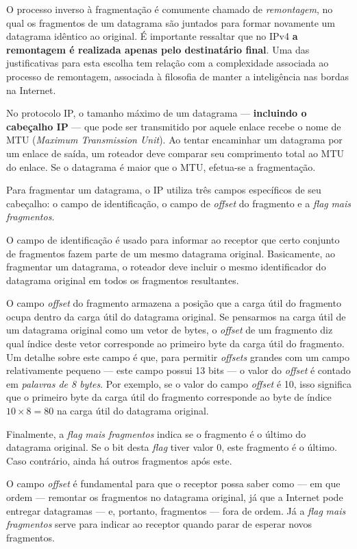 \documentclass{article}
\begin{document}
O processo inverso à fragmentação é comumente chamado de \textit{remontagem}, no qual os fragmentos de um datagrama são juntados para formar novamente um datagrama idêntico ao original. É importante ressaltar que no IPv4 \textbf{a remontagem é realizada apenas pelo destinatário final}. Uma das justificativas para esta escolha tem relação com a complexidade associada ao processo de remontagem, associada à filosofia de manter a inteligência nas bordas na Internet.

No protocolo IP, o tamanho máximo de um datagrama --- \textbf{incluindo o cabeçalho IP} --- que pode ser transmitido por aquele enlace recebe o nome de MTU (\textit{Maximum Transmission Unit}). Ao tentar encaminhar um datagrama por um enlace de saída, um roteador deve comparar seu comprimento total ao MTU do enlace. Se o datagrama é maior que o MTU, efetua-se a fragmentação.

Para fragmentar um datagrama, o IP utiliza três campos específicos de seu cabeçalho: o campo de identificação, o campo de \textit{offset} do fragmento e a \textit{flag} \textit{mais fragmentos}. 

O campo de identificação é usado para informar ao receptor que certo conjunto de fragmentos fazem parte de um mesmo datagrama original. Basicamente, ao fragmentar um datagrama, o roteador deve incluir o mesmo identificador do datagrama original em todos os fragmentos resultantes.

O campo \textit{offset} do fragmento armazena a posição que a carga útil do fragmento ocupa dentro da carga útil do datagrama original. Se pensarmos na carga útil de um datagrama original como um vetor de bytes, o \textit{offset} de um fragmento diz qual índice deste vetor corresponde ao primeiro byte da carga útil do fragmento. Um detalhe sobre este campo é que, para permitir \textit{offsets} grandes com um campo relativamente pequeno --- este campo possui 13 bits --- o valor do \textit{offset} é contado em \textit{palavras de 8 bytes}. Por exemplo, se o valor do campo \textit{offset} é 10, isso significa que o primeiro byte da carga útil do fragmento corresponde ao byte de índice $10\times 8 = 80$ na carga útil do datagrama original.

Finalmente, a \textit{flag} \textit{mais fragmentos} indica se o fragmento é o último do datagrama original. Se o bit desta \textit{flag} tiver valor 0, este fragmento é o último. Caso contrário, ainda há outros fragmentos após este.

O campo \textit{offset} é fundamental para que o receptor possa saber como --- em que ordem --- remontar os fragmentos no datagrama original, já que a Internet pode entregar datagramas --- e, portanto, fragmentos --- fora de ordem. Já a \textit{flag} \textit{mais fragmentos} serve para indicar ao receptor quando parar de esperar novos fragmentos.
\end{document}

